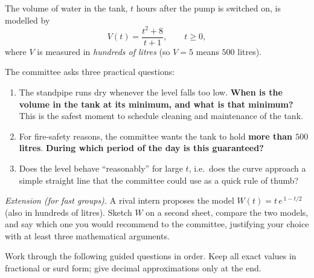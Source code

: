 \documentclass[11pt]{article}
\newcounter{popsec}
\newcounter{popsub}
\newcommand{\courssub}[1]{%
  \stepcounter{popsub}%
  \par\vspace{9pt}\noindent{\popxbold\fontsize{11.5}{13}\selectfont\color{popink}{\color{poporange}\thepopsec.\thepopsub}\hspace{6pt}#1}\par\nopagebreak\vspace{4pt}
}
\begin{document}
The volume of water in the tank, $t$ hours after the pump is switched on, is modelled by
\[ V(t) = \frac{t^{2} + 8}{t + 1}, \qquad t \geq 0, \]
where $V$ is measured in \emph{hundreds of litres} (so $V = 5$ means $500$ litres).

The committee asks three practical questions:

\begin{enumerate}
\item The standpipe runs dry whenever the level falls too low. \textbf{When is the volume in the tank at its minimum, and what is that minimum?} This is the safest moment to schedule cleaning and maintenance of the tank.
\item For fire-safety reasons, the committee wants the tank to hold \textbf{more than $500$ litres}. \textbf{During which period of the day is this guaranteed?}
\item Does the level behave ``reasonably'' for large $t$, i.e.\ does the curve approach a simple straight line that the committee could use as a quick rule of thumb?
\end{enumerate}

\emph{Extension (for fast groups).} A rival intern proposes the model $W(t) = t\,e^{\,1 - t/2}$ (also in hundreds of litres). Sketch $W$ on a second sheet, compare the two models, and say which one you would recommend to the committee, justifying your choice with at least three mathematical arguments.

\courssub{Tasks}

Work through the following guided questions in order. Keep all exact values in fractional or surd form; give decimal approximations only at the end.
\end{document}
